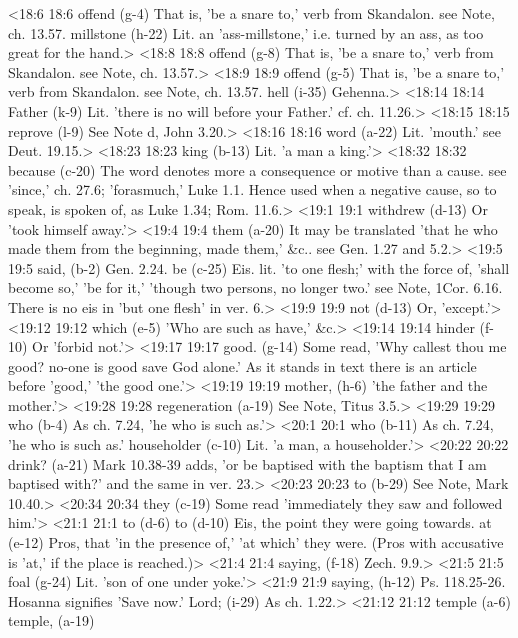 <18:6 18:6  offend (g-4) That is, 'be a snare to,' verb from Skandalon. see Note,  ch. 13.57.
  millstone (h-22)  Lit. an 'ass-millstone,' i.e. turned by an ass, as too great  for the hand.>
<18:8 18:8  offend (g-8) That is, 'be a snare to,' verb from Skandalon. see Note,  ch. 13.57.>
<18:9 18:9  offend (g-5)  That is, 'be a snare to,' verb from Skandalon. see Note,  ch. 13.57.
  hell (i-35)  Gehenna.>
<18:14 18:14  Father (k-9)  Lit. 'there is no will before your Father.' cf. ch. 11.26.>
<18:15 18:15  reprove (l-9)  See Note d, John 3.20.>
<18:16 18:16  word (a-22)  Lit. 'mouth.' see Deut. 19.15.>
<18:23 18:23  king (b-13)  Lit. 'a man a king.'>
<18:32 18:32  because (c-20)  The word denotes more a consequence or motive than a cause.  see 'since,' ch. 27.6; 'forasmuch,' Luke 1.1. Hence used when a  negative cause, so to speak, is spoken of, as Luke 1.34; Rom.  11.6.>
<19:1 19:1  withdrew (d-13)  Or 'took himself away.'>
<19:4 19:4  them (a-20)  It may be translated 'that he who made them from the  beginning, made them,' &c.. see Gen. 1.27 and 5.2.>
<19:5 19:5  said, (b-2)  Gen. 2.24.
  be (c-25)  Eis. lit. 'to one flesh;' with the force of, 'shall become  so,' 'be for it,' 'though two persons, no longer two.' see  Note, 1Cor. 6.16. There is no eis in 'but one flesh' in ver. 6.>
<19:9 19:9  not (d-13)  Or, 'except.'>
<19:12 19:12  which (e-5)  'Who are such as have,' &c.>
<19:14 19:14  hinder (f-10)  Or 'forbid not.'>
<19:17 19:17  good. (g-14)  Some read, 'Why callest thou me good? no-one is good save God  alone.' As it stands in text there is an article before 'good,'  'the good one.'>
<19:19 19:19  mother, (h-6)  'the father and the mother.'>
<19:28 19:28  regeneration (a-19)  See Note, Titus 3.5.>
<19:29 19:29  who (b-4) As ch. 7.24, 'he who is such as.'>
<20:1 20:1  who (b-11)  As ch. 7.24, 'he who is such as.'
  householder (c-10)  Lit. 'a man, a householder.'>
<20:22 20:22  drink? (a-21)  Mark 10.38-39 adds, 'or be baptised with the baptism that I  am baptised with?' and the same in ver. 23.>
<20:23 20:23  to (b-29)  See Note, Mark 10.40.>
<20:34 20:34  they (c-19)  Some read 'immediately they saw and followed him.'>
<21:1 21:1  to (d-6)  to (d-10)
  Eis, the point they were going towards.
  at (e-12)  Pros, that 'in the presence of,' 'at which' they were.  (Pros with accusative is 'at,' if the place is reached.)>
<21:4 21:4  saying, (f-18)  Zech. 9.9.>
<21:5 21:5  foal (g-24)  Lit. 'son of one under yoke.'>
<21:9 21:9  saying, (h-12)  Ps. 118.25-26. Hosanna signifies 'Save now.'
  Lord; (i-29)  As ch. 1.22.>
<21:12 21:12  temple (a-6)  temple, (a-19)
